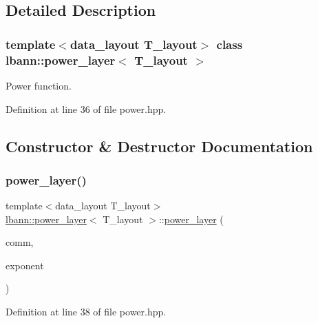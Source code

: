 \subsection{Detailed Description}
\subsubsection*{template$<$data\+\_\+layout T\+\_\+layout$>$\newline
class lbann\+::power\+\_\+layer$<$ T\+\_\+layout $>$}

Power function. 

Definition at line 36 of file power.\+hpp.



\subsection{Constructor \& Destructor Documentation}
\mbox{\label{classlbann_1_1power__layer_a0429ad3cad14663b8fea013360b60e04}} 
\subsubsection{\texorpdfstring{power\+\_\+layer()}{power\_layer()}}
{\footnotesize\ttfamily template$<$data\+\_\+layout T\+\_\+layout$>$ \\
\hyperlink{classlbann_1_1power__layer}{lbann\+::power\+\_\+layer}$<$ T\+\_\+layout $>$\+::\hyperlink{classlbann_1_1power__layer}{power\+\_\+layer} (\begin{DoxyParamCaption}\item[{\hyperlink{classlbann_1_1lbann__comm}{lbann\+\_\+comm} $\ast$}]{comm,  }\item[{\hyperlink{base_8hpp_a3266f5ac18504bbadea983c109566867}{Eval\+Type}}]{exponent }\end{DoxyParamCaption})\hspace{0.3cm}{\ttfamily [inline]}}



Definition at line 38 of file power.\+hpp.


